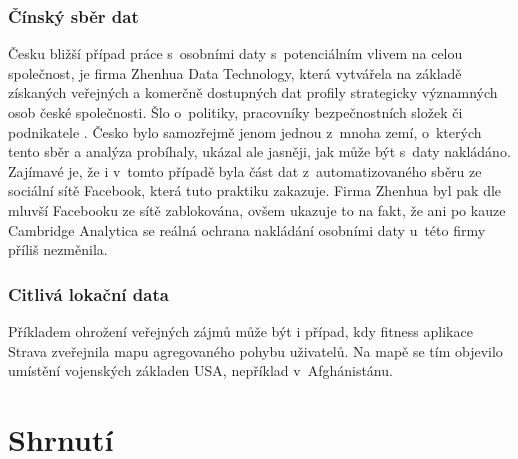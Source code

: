 \subsubsection{Čínský sběr dat}
Česku bližší případ práce s~osobními daty s~potenciálním vlivem na celou společnost, je firma Zhenhua Data Technology, která vytvářela na základě získaných veřejných a komerčně dostupných dat profily strategicky významných osob české společnosti. Šlo o~politiky, pracovníky bezpečnostních složek či podnikatele \citep{china-czech}. Česko bylo samozřejmě jenom jednou z~mnoha zemí, o~kterých tento sběr a analýza probíhaly, ukázal ale jasněji, jak může být s~daty nakládáno.
Zajímavé je, že i v~tomto případě byla část dat z~automatizovaného sběru ze sociální sítě Facebook, která tuto praktiku zakazuje. Firma Zhenhua byl pak dle mluvší Facebooku ze sítě zablokována, ovšem ukazuje to na fakt, že ani po kauze Cambridge Analytica se reálná ochrana nakládání osobními daty u~této firmy příliš nezměnila.

\subsubsection{Citlivá lokační data}
Příkladem ohrožení veřejných zájmů může být i případ, kdy fitness aplikace Strava zveřejnila mapu agregovaného pohybu uživatelů. Na mapě se tím objevilo umístění vojenských základen USA, nepříklad v~Afghánistánu.\citep{strava-locations}

\section{Shrnutí}
